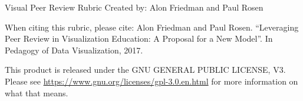\documentclass[a4paper,12pt]{article}
\begin{document}
\begin{centering}
{ \Large Visual Peer Review Rubric}
{Created by: Alon Friedman and Paul Rosen}
\end{centering}

When citing this rubric, please cite: Alon Friedman and Paul Rosen. ``Leveraging Peer Review in Visualization Education: A Proposal for a New Model''. In Pedagogy of Data Visualization, 2017.

This product is released under the GNU GENERAL PUBLIC LICENSE, V3. Please see \url{https://www.gnu.org/licenses/gpl-3.0.en.html} for more information on what that means.







\end{document}
